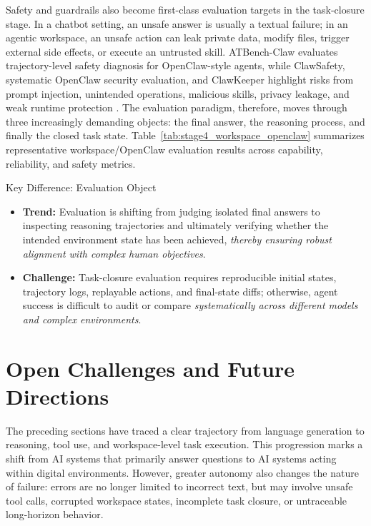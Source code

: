 Safety and guardrails also become first-class evaluation targets in the task-closure stage. In a chatbot setting, an unsafe answer is usually a textual failure; in an agentic workspace, an unsafe action can leak private data, modify files, trigger external side effects, or execute an untrusted skill. ATBench-Claw evaluates trajectory-level safety diagnosis for OpenClaw-style agents, while ClawSafety, systematic OpenClaw security evaluation, and ClawKeeper highlight risks from prompt injection, unintended operations, malicious skills, privacy leakage, and weak runtime protection \citep{yang2026atbenchclaw,wei2026clawsafety,wang2026openclawsec,liu2026clawkeeper}. The evaluation paradigm, therefore, moves through three increasingly demanding objects: the final answer, the reasoning process, and finally the closed task state. Table~\ref{tab:stage4_workspace_openclaw} summarizes representative workspace/OpenClaw evaluation results across capability, reliability, and safety metrics.



\begin{AIbox}{Key Difference: Evaluation Object}
    \begin{itemize}[left=2pt,topsep=1pt,itemsep=2pt, parsep=1pt]
\item \textbf{Trend:} Evaluation is shifting from judging isolated final answers to inspecting reasoning trajectories and ultimately verifying whether the intended environment state has been achieved, \textit{thereby ensuring robust alignment with complex human objectives}.

\item \textbf{Challenge:} Task-closure evaluation requires reproducible initial states, trajectory logs, replayable actions, and final-state diffs; otherwise, agent success is difficult to audit or compare \textit{systematically across different models and complex environments}.
    \end{itemize}
\end{AIbox}


\section{Open Challenges and Future Directions}


The preceding sections have traced a clear trajectory from language generation to reasoning, tool use, and workspace-level task execution.
This progression marks a shift from AI systems that primarily answer questions to AI systems acting within digital environments.
However, greater autonomy also changes the nature of failure: errors are no longer limited to incorrect text, but may involve unsafe tool calls, corrupted workspace states, incomplete task closure, or untraceable long-horizon behavior.

